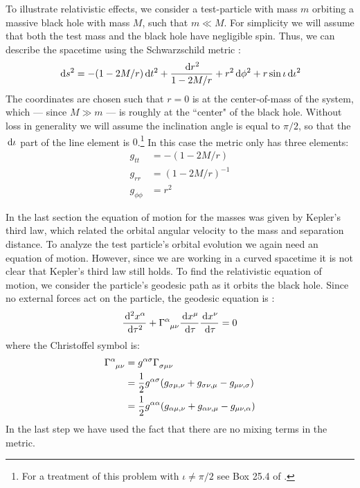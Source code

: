To illustrate relativistic effects, we consider a test-particle with mass $m$ orbiting a massive black hole with mass $M$, such that $m \ll M$. For simplicity we will assume that both the test mass and the black hole have negligible spin. Thus, we can describe the spacetime using the Schwarzschild metric \cite{MTW}:
\begin{equation}
\,\mathrm{d} s^2 = - (1 - 2M/r)\,\mathrm{d} t^2 + \frac{\,\mathrm{d} r^2}{1 - 2M/r} + r^2\,\mathrm{d}\phi^2 + r\sin\iota \,\mathrm{d}\iota^2
\end{equation}
The coordinates are chosen such that $r=0$ is at the center-of-mass of the system, which --- since $M \gg m$ --- is roughly at the ``center" of the black hole. Without loss in generality we will assume the inclination angle is equal to $\pi/2$, so that the $\,\mathrm{d}\iota$ part of the line element is $0$.\footnote{For a treatment of this problem with $\iota \neq \pi/2$ see Box 25.4 of \cite{MTW}.} In this case the metric only has three elements:
\begin{subequations}
\begin{align}
g_{tt} &= - (1 - 2M/r) \\
g_{rr} &= (1-2M/r)^{-1} \\
g_{\phi\phi} &= r^2
\end{align}
\end{subequations}

In the last section the equation of motion for the masses was given by Kepler's third law, which related the orbital angular velocity to the mass and separation distance. To analyze the test particle's orbital evolution we again need an equation of motion. However, since we are working in a curved spacetime it is not clear that Kepler's third law still holds. To find the relativistic equation of motion, we consider the particle's geodesic path as it orbits the black hole. Since no external forces act on the particle, the geodesic equation is \cite{MTW, Schutz, Carroll}:
\begin{equation}
\frac{\d^2 x^{\alpha}}{\d \tau^2} + \Gamma\indices{^\alpha_{\mu \nu}} \frac{\d x^{\mu}}{\d\tau} \frac{\d x^{\nu}}{\d\tau} = 0
\end{equation}
where the Christoffel symbol is:
\begin{align}
\label{eqn:christoffel_symbols}
\Gamma\indices{^\alpha_{\mu\nu}} &= g^{\alpha\sigma}\Gamma\indices{_{\sigma\mu\nu}} \nonumber \\
    &= \frac{1}{2}g^{\alpha\sigma}( g_{\sigma\mu,\nu} + g_{\sigma\nu,\mu} - g_{\mu\nu,\sigma}) \nonumber \\
    &= \frac{1}{2}g^{\alpha\alpha}(g_{\alpha\mu,\nu} + g_{\alpha\nu,\mu} - g_{\mu\nu,\alpha})
\end{align}
In the last step we have used the fact that there are no mixing terms in the metric. 

